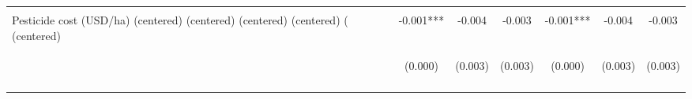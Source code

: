 \begin{center}
\begin{tabular}{lcccccc}
\vspace{4pt} & \begin{footnotesize}[0.505]\end{footnotesize} & \begin{footnotesize}[0.106]\end{footnotesize} & \begin{footnotesize}[0.117]\end{footnotesize} & \begin{footnotesize}[0.505]\end{footnotesize} & \begin{footnotesize}[0.106]\end{footnotesize} & \begin{footnotesize}[0.117]\end{footnotesize} \\
Pesticide cost (USD/ha) (centered) (centered) (centered) (centered) ( (centered) & -0.001*** & -0.004 & -0.003 & -0.001*** & -0.004 & -0.003 \\
 & \begin{footnotesize}(0.000)\end{footnotesize} & \begin{footnotesize}(0.003)\end{footnotesize} & \begin{footnotesize}(0.003)\end{footnotesize} & \begin{footnotesize}(0.000)\end{footnotesize} & \begin{footnotesize}(0.003)\end{footnotesize} & \begin{footnotesize}(0.003)\end{footnotesize} \\
\vspace{4pt} & \begin{footnotesize}[0.007]\end{footnotesize} & \begin{footnotesize}[0.218]\end{footnotesize} & \begin{footnotesize}[0.280]\end{footnotesize} & \begin{footnotesize}[0.007]\end{footnotesize} & \begin{footnotesize}[0.218]\end{footnotesize} & \begin{footnotesize}[0.280]\end{footnotesize} \\

\end{tabular}
\end{center}

